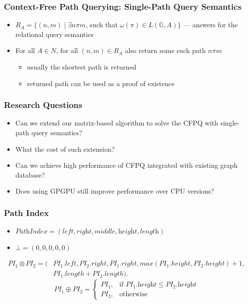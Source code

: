 \documentclass[xcolor=table]{beamer}
\begin{document}
\begin{frame}[fragile]
\frametitle{Context-Free Path Querying: Single-Path Query Semantics}
\begin{itemize}
	\item $R_A = \{ (n, m) \mid \exists n \pi m$, such that $\omega(\pi) \in L(\mathbb{G},A)\}$ --- answers for the relational query semantics
	\pause
	\item For all $A \in N$, for all $(n,m) \in R_A$ also return some such path $n\pi m$
	\begin{itemize}
		\item usually the shortest path is returned
		\item returned path can be used as a proof of existence
	\end{itemize}
	
\end{itemize}
\end{frame}

\begin{frame}[fragile] \frametitle{Research Questions}
\begin{itemize}
	\item Can we extend our matrix-based algorithm to solve the CFPQ with single-path query semantics?
	\item What the cost of such extension?
	\item Can we achieve high performance of CFPQ integrated with existing graph database?
	\item Does using GPGPU still improve performance over CPU versions?
\end{itemize}
\end{frame}

\begin{frame}[fragile] \frametitle{Path Index}
\begin{itemize}
	\item $\textit{PathIndex} = (\textit{left},\textit{right},\textit{middle},\textit{height},\textit{length})$
	\pause
	\item $\bot = (0, 0, 0, 0, 0)$
\end{itemize}
\pause
\begin{align*}
PI_1 \otimes PI_2 = (&PI_1.left, PI_2.right, PI_1.right,
max(PI_1.height, PI_2.height)+1,\\
&PI_1.length + PI_2.length).
\end{align*}
\pause
$$PI_1 \oplus PI_2 = \begin{cases} PI_1, & \mbox{if } PI_1.\textit{height} \leq PI_2.\textit{height} \\ PI_2, & \mbox{otherwise} \end{cases}$$
\end{frame}
\end{document}
